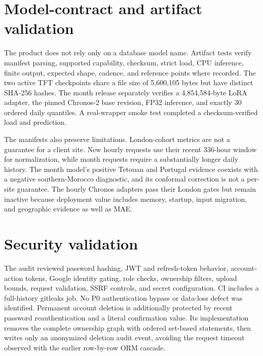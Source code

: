 \section{Model-contract and artifact validation}

The product does not rely only on a database model name. Artifact tests verify manifest parsing, supported capability, checksum, strict load, CPU inference, finite output, expected shape, cadence, and reference points where recorded. The two active TFT checkpoints share a file size of 5,600,105 bytes but have distinct SHA-256 hashes. The month release separately verifies a 4,854,584-byte LoRA adapter, the pinned Chronos-2 base revision, FP32 inference, and exactly 30 ordered daily quantiles. A real-wrapper smoke test completed a checksum-verified load and prediction.

The manifests also preserve limitations. London-cohort metrics are not a guarantee for a client site. New hourly requests use their recent 336-hour window for normalization, while month requests require a substantially longer daily history. The month model's positive Tetouan and Portugal evidence coexists with a negative southern-Morocco diagnostic, and its conformal correction is not a per-site guarantee. The hourly Chronos adapters pass their London gates but remain inactive because deployment value includes memory, startup, input migration, and geographic evidence as well as MAE.

\section{Security validation}

The audit reviewed password hashing, JWT and refresh-token behavior, account-action tokens, Google identity gating, role checks, ownership filters, upload bounds, request validation, SSRF controls, and secret configuration. CI includes a full-history gitleaks job. No P0 authentication bypass or data-loss defect was identified. Permanent account deletion is additionally protected by recent password reauthentication and a literal confirmation value. Its implementation removes the complete ownership graph with ordered set-based statements, then writes only an anonymized deletion audit event, avoiding the request timeout observed with the earlier row-by-row ORM cascade.

